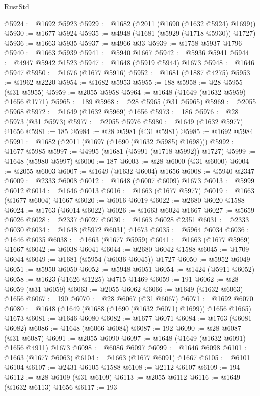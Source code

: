 \begin{lexlean}{RustStd}
\begin{coremodule}
{\begin{coremodule}
{{{{{{{{{{{{{{{{{{{{{{{{{{{{{{{{{{{{{{{{{{{{@5924 := @1692 @5923
@5929 := @1682 (@2011 (@1690 (@1632 @5924) @1699))
@5930 := @1677 @5924
@5935 := @4948 (@1681 (@5929 (@1718 @5930)) @1727)
@5936 := @1663 @5935
@5937 := @4966 @33
@5939 := @1758 @5937 @1796
@5940 := @1663 @5939
@5941 := @5940 @1667
@5942 := @5936 @5941
@5944 := @4947 @5942 @1523
@5947 := @1648 (@5919 @5944) @1673
@5948 := @1646 @5947
@5950 := @1676 (@1677 @5916)
@5952 := @1681 (@1887 @4275)
@5953 := @1962 @2220
@5954 := @1682 @5953
@5955 := 188
@5958 := @28 @5955 (@31 @5955)
@5959 := @2055 @5958
@5964 := @1648 (@1649 (@1632 @5959) @1656 @1771)
@5965 := 189
@5968 := @28 @5965 (@31 @5965)
@5969 := @2055 @5968
@5972 := @1649 (@1632 @5969) @1656
@5973 := 186
@5976 := @28 @5973 (@31 @5973)
@5977 := @2055 @5976
@5980 := @1649 (@1632 @5977) @1656
@5981 := 185
@5984 := @28 @5981 (@31 @5981)
@5985 := @1692 @5984
@5991 := @1682 (@2011 (@1697 (@1690 (@1632 @5985) @1698)))
@5992 := @1677 @5985
@5997 := @4995 (@1681 (@5991 (@1718 @5992)) @1727)
@5999 := @1648 (@5980 @5997)
@6000 := 187
@6003 := @28 @6000 (@31 @6000)
@6004 := @2055 @6003
@6007 := @1649 (@1632 @6004) @1656
@6008 := @5940 @2347
@6009 := @2333 @6008
@6012 := @1648 (@6007 @6009) @1673
@6013 := @5999 @6012
@6014 := @1646 @6013
@6016 := @1663 (@1677 @5977)
@6019 := @1663 (@1677 @6004) @1667
@6020 := @6016 @6019
@6022 := @2680 @6020 @1588
@6024 := @1763 (@6014 @6022)
@6026 := @1663 @6024 @1667
@6027 := @5659 @6026
@6028 := @2337 @6027
@6030 := @1663 @6028 @2351
@6031 := @2333 @6030
@6034 := @1648 (@5972 @6031) @1673
@6035 := @5964 @6034
@6036 := @1646 @6035
@6038 := @1663 (@1677 @5959)
@6041 := @1663 (@1677 @5969) @1667
@6042 := @6038 @6041
@6044 := @2680 @6042 @1588
@6045 := @1709 @6044
@6049 := @1681 (@5954 (@6036 @6045)) @1727
@6050 := @5952 @6049
@6051 := @5950 @6050
@6052 := @5948 @6051
@6054 := @1424 (@5911 @6052)
@6058 := @1623 (@1626 @1225) @4715 @1469
@6059 := 191
@6062 := @28 @6059 (@31 @6059)
@6063 := @2055 @6062
@6066 := @1649 (@1632 @6063) @1656
@6067 := 190
@6070 := @28 @6067 (@31 @6067)
@6071 := @1692 @6070
@6080 := @1648 (@1649 (@1688 (@1690 (@1632 @6071) @1699)) @1656 @1665) @1673
@6081 := @1646 @6080
@6082 := @1677 @6071
@6084 := @1763 (@6081 @6082)
@6086 := @1648 (@6066 @6084)
@6087 := 192
@6090 := @28 @6087 (@31 @6087)
@6091 := @2055 @6090
@6097 := @1648 (@1649 (@1632 @6091) @1656 @4911) @1673
@6098 := @6086 @6097
@6099 := @1646 @6098
@6101 := @1663 (@1677 @6063)
@6104 := @1663 (@1677 @6091) @1667
@6105 := @6101 @6104
@6107 := @2431 @6105 @1588
@6108 := @2112 @6107
@6109 := 194
@6112 := @28 @6109 (@31 @6109)
@6113 := @2055 @6112
@6116 := @1649 (@1632 @6113) @1656
@6117 := 193
}}}}}}}}}}}}}}}}}}}}}}}}}}}}}}}}}}}}}}}}}}}}
\end{coremodule}}
\end{coremodule}
\end{lexlean}
